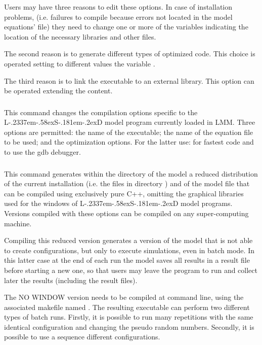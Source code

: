 \documentclass [11pt,a4paper] {book}
\def\LsD{{L\kern-.2337em\lower-.58ex\hbox{S}\kern-.181em\lower-.2ex\hbox{D}}\xspace}
\begin{document}
Users may have three reasons to edit these options. In case of installation problems, (i.e. failures to compile because errors not located in the model equations' file) they need to change one or more of the variables indicating the location of the necessary libraries and other files.

The second reason is to generate different types of optimized code. This choice is operated setting to different values the variable .

The third reason is to link the executable to an external library. This option can be operated extending the  content.

\subsubsection{}

This command changes the compilation options specific to the \LsD model program currently loaded in LMM. Three options are permitted: the name of the executable; the name of the equation file to be used; and the optimization options. For the latter use:  for fastest code and  to use the gdb debugger.


\subsubsection{}
This command generates within the directory of the model a reduced distribution of the current installation (i.e. the files in directory ) and of the model file that can be compiled using exclusively pure C++, omitting the graphical libraries 	used for the windows of \LsD model programs. Versions compiled with these options can be compiled on any super-computing machine.

Compiling this reduced version generates a version of the model that is not able to create configurations, but only to execute simulations, even in batch mode. In this latter case at the end of each run the model saves all results in a result  file before starting a new one, so that users may leave the program to run and collect later the results (including the  result files).

The NO WINDOW version needs to be compiled at command line, using the associated makefile named . The resulting executable can perform two different types of batch runs. Firstly, it is possible to run many repetitions with the same identical configuration and changing the pseudo random numbers. Secondly, it is possible to use a sequence different configurations.
\end{document}
